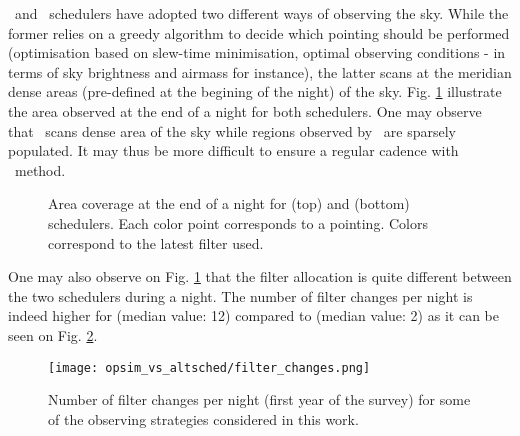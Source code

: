 \opsim~and \altsched~schedulers have adopted two different ways of observing the sky. While the former relies on a greedy algorithm to decide which pointing should be performed (optimisation based on slew-time minimisation, optimal observing conditions - in terms of sky brightness and airmass for instance), the latter scans at the meridian dense areas (pre-defined at the begining of the night) of the sky. Fig. \ref{fig:night_comp} illustrate the area observed at the end of a night for both schedulers. One may observe that \altsched~scans dense area of the sky while regions observed by \opsim~are sparsely populated. It may thus be more difficult to ensure a regular cadence with \opsim~method.

\begin{figure}[!htbp]
  \centering
  \caption{Area coverage at the end of a night for \opsim(top) and \altsched(bottom) schedulers.  Each color point corresponds to a pointing. Colors correspond to the latest filter used.}\label{fig:night_comp}
\end{figure}

One may also observe on Fig. \ref{fig:night_comp} that the filter allocation is quite different between the two schedulers during a night. The number of filter changes per night is indeed higher for \altsched(median value: 12) compared to \opsim(median value: 2) as it can be seen on Fig. \ref{fig:filter_changes}.

\begin{figure}[!htbp]
  \begin{center}
    \texttt{[image: opsim\_vs\_altsched/filter\_changes.png]}
    \caption{Number of filter changes per night (first year of the survey) for some of the observing strategies considered in this work.}\label{fig:filter_changes}
    \end{center}
\end{figure}
